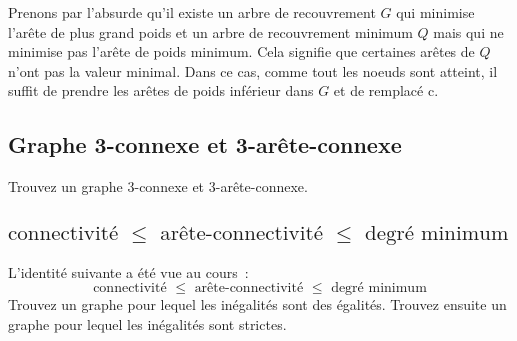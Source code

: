 \begin{solution}
Prenons par l'absurde qu'il existe un arbre de recouvrement $G$ qui minimise l'arête de plus grand poids et un arbre de recouvrement minimum $Q$ mais qui ne minimise pas l'arête de poids minimum. Cela signifie que certaines arêtes de $Q$ n'ont pas la valeur minimal. Dans ce cas, comme tout les noeuds sont atteint, il suffit de prendre les arêtes de poids inférieur dans $G$ et de remplacé c.
\end{solution}

\subsection{Graphe 3-connexe et 3-arête-connexe}
Trouvez un graphe 3-connexe et 3-arête-connexe.

\begin{solution}
\end{solution}

\subsection{$ \text{connectivité } \leq \text{ arête-connectivité } \leq \text{ degré minimum} $}
L'identité suivante a été vue au cours~:
\[
  \text{connectivité } \leq \text{ arête-connectivité } \leq \text{ degré minimum}
\]
Trouvez un graphe pour lequel les inégalités sont des égalités. Trouvez ensuite un graphe pour lequel les inégalités sont strictes.

